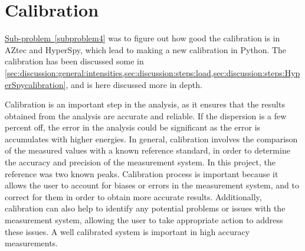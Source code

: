 















%
\section{Calibration}
\label{sec:discussion:calibration}

\hyperref[subproblem4]{Sub-problem~\ref*{subproblem4}} was to figure out how good the calibration is in AZtec and HyperSpy, which lead to making a new calibration in Python.
The calibration has been discussed some in \cref{sec:discussion:general:intensities,sec:discussion:steps:load,sec:discussion:steps:HyperSpycalibration}, and is here discussed more in depth.

Calibration is an important step in the analysis, as it ensures that the results obtained from the analysis are accurate and reliable.
If the dispersion is a few percent off, the error in the analysis could be significant as the error is accumulates with higher energies.
In general, calibration involves the comparison of the measured values with a known reference standard, in order to determine the accuracy and precision of the measurement system.
In this project, the reference was two known peaks.
Calibration process is important because it allows the user to account for biases or errors in the measurement system, and to correct for them in order to obtain more accurate results.
Additionally, calibration can also help to identify any potential problems or issues with the measurement system, allowing the user to take appropriate action to address these issues.
A well calibrated system is important in high accuracy measurements.


